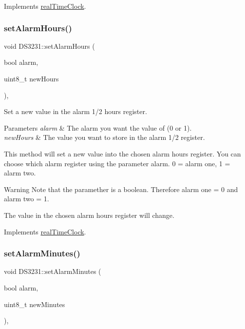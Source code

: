 Implements \mbox{\hyperlink{classreal_time_clock_a2c2bb16a7fc59f463fb3aaed2fcd1926}{real\+Time\+Clock}}.

\mbox{\label{class_d_s3231_a0bcc7e2285869ffbe29d19c593f5a447}} 
\subsubsection{\texorpdfstring{set\+Alarm\+Hours()}{setAlarmHours()}}
{\footnotesize\ttfamily void D\+S3231\+::set\+Alarm\+Hours (\begin{DoxyParamCaption}\item[{bool}]{alarm,  }\item[{uint8\+\_\+t}]{new\+Hours }\end{DoxyParamCaption})\hspace{0.3cm}{\ttfamily [override]}, {\ttfamily [virtual]}}



Set a new value in the alarm 1/2 hours register. 


\begin{DoxyParams}{Parameters}
{\em alarm} & The alarm you want the value of (0 or 1). \\
\hline
{\em new\+Hours} & The value you want to store in the alarm 1/2 register.\\
\hline
\end{DoxyParams}
This method will set a new value into the chosen alarm hours register. You can choose which alarm register using the parameter alarm. 0 = alarm one, 1 = alarm two. \begin{DoxyWarning}{Warning}
Note that the paramether is a boolean. Therefore alarm one = 0 and alarm two = 1. 

The value in the chosen alarm hours register will change. 
\end{DoxyWarning}


Implements \mbox{\hyperlink{classreal_time_clock_a9f0cd64ce9a783f149fcbb9f7eb36524}{real\+Time\+Clock}}.

\mbox{\label{class_d_s3231_a9c1f5b183c24f3062c1c8c299f46023c}} 
\subsubsection{\texorpdfstring{set\+Alarm\+Minutes()}{setAlarmMinutes()}}
{\footnotesize\ttfamily void D\+S3231\+::set\+Alarm\+Minutes (\begin{DoxyParamCaption}\item[{bool}]{alarm,  }\item[{uint8\+\_\+t}]{new\+Minutes }\end{DoxyParamCaption})\hspace{0.3cm}{\ttfamily [override]}, {\ttfamily [virtual]}}




